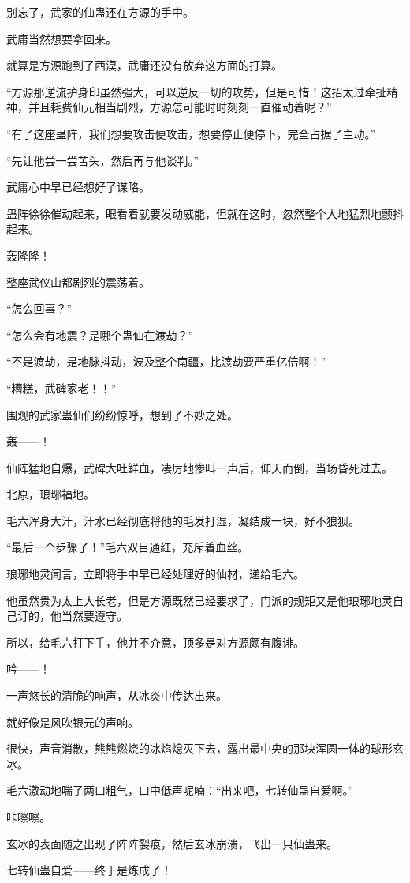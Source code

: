 \begin{this_body}
别忘了，武家的仙蛊还在方源的手中。

武庸当然想要拿回来。

就算是方源跑到了西漠，武庸还没有放弃这方面的打算。

“方源那逆流护身印虽然强大，可以逆反一切的攻势，但是可惜！这招太过牵扯精神，并且耗费仙元相当剧烈，方源怎可能时时刻刻一直催动着呢？”

“有了这座蛊阵，我们想要攻击便攻击，想要停止便停下，完全占据了主动。”

“先让他尝一尝苦头，然后再与他谈判。”

武庸心中早已经想好了谋略。

蛊阵徐徐催动起来，眼看着就要发动威能，但就在这时，忽然整个大地猛烈地颤抖起来。

轰隆隆！

整座武仪山都剧烈的震荡着。

“怎么回事？”

“怎么会有地震？是哪个蛊仙在渡劫？”

“不是渡劫，是地脉抖动，波及整个南疆，比渡劫要严重亿倍啊！”

“糟糕，武碑家老！！”

围观的武家蛊仙们纷纷惊呼，想到了不妙之处。

轰——！

仙阵猛地自爆，武碑大吐鲜血，凄厉地惨叫一声后，仰天而倒，当场昏死过去。

北原，琅琊福地。

毛六浑身大汗，汗水已经彻底将他的毛发打湿，凝结成一块，好不狼狈。

“最后一个步骤了！”毛六双目通红，充斥着血丝。

琅琊地灵闻言，立即将手中早已经处理好的仙材，递给毛六。

他虽然贵为太上大长老，但是方源既然已经要求了，门派的规矩又是他琅琊地灵自己订的，他当然要遵守。

所以，给毛六打下手，他并不介意，顶多是对方源颇有腹诽。

吟——！

一声悠长的清脆的响声，从冰炎中传达出来。

就好像是风吹银元的声响。

很快，声音消散，熊熊燃烧的冰焰熄灭下去，露出最中央的那块浑圆一体的球形玄冰。

毛六激动地喘了两口粗气，口中低声呢喃：“出来吧，七转仙蛊自爱啊。”

咔嚓嚓。

玄冰的表面随之出现了阵阵裂痕，然后玄冰崩溃，飞出一只仙蛊来。

七转仙蛊自爱——终于是炼成了！

\end{this_body}

